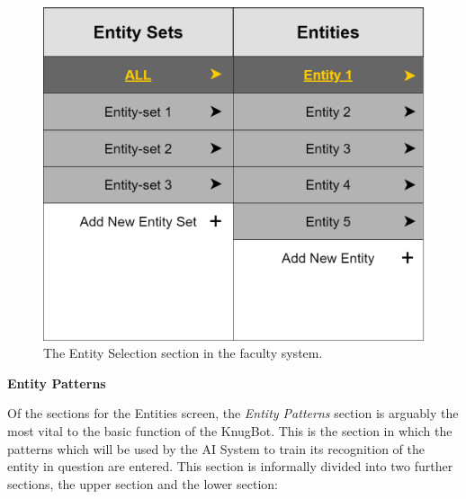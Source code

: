 \documentclass[titlepage, 12pt]{article}
\begin{document}
\begin{figure}[h]
    \centering\includegraphics[width=0.75\linewidth]{images/system-design/faculty-entities-panel.png}
    \caption{The Entity Selection section in the faculty system.}
\end{figure}

\textbf{Entity Patterns}

Of the sections for the Entities screen, the \emph{Entity Patterns} section is arguably the most vital to the basic function of the KnugBot. This is the section in which the patterns which will be used by the AI System to train its recognition of the entity in question are entered. This section is informally divided into two further sections, the upper section and the lower section:
\end{document}
